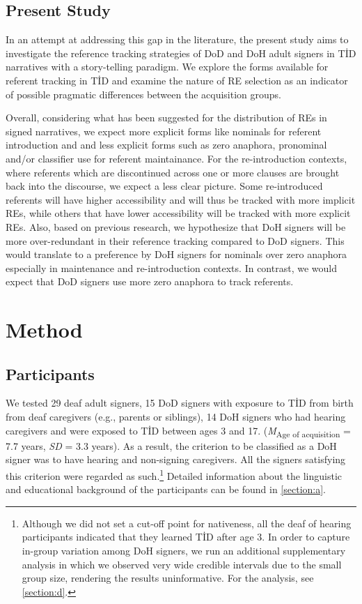 \documentclass[]{elsarticle} %
\begin{document}
\hypertarget{present-study}{%
\subsection{Present Study}\label{present-study}}

In an attempt at addressing this gap in the literature, the present
study aims to investigate the reference tracking strategies of DoD and
DoH adult signers in TİD narratives with a story-telling paradigm. We
explore the forms available for referent tracking in TİD and examine the
nature of RE selection as an indicator of possible pragmatic differences
between the acquisition groups.

Overall, considering what has been suggested for the distribution of REs
in signed narratives, we expect more explicit forms like nominals for
referent introduction and and less explicit forms such as zero anaphora,
pronominal and/or classifier use for referent maintainance. For the
re-introduction contexts, where referents which are discontinued across
one or more clauses are brought back into the discourse, we expect a
less clear picture. Some re-introduced referents will have higher
accessibility and will thus be tracked with more implicit REs, while
others that have lower accessibility will be tracked with more explicit
REs. Also, based on previous research, we hypothesize that DoH signers
will be more over-redundant in their reference tracking compared to DoD
signers. This would translate to a preference by DoH signers for
nominals over zero anaphora especially in maintenance and
re-introduction contexts. In contrast, we would expect that DoD signers
use more zero anaphora to track referents.

\hypertarget{method}{%
\section{Method}\label{method}}

\hypertarget{participants}{%
\subsection{Participants}\label{participants}}

We tested 29 deaf adult signers, 15 DoD signers with exposure to TİD
from birth from deaf caregivers (e.g., parents or siblings), 14 DoH
signers who had hearing caregivers and were exposed to TİD between ages
3 and 17. (\emph{M}\textsubscript{Age of acquisition} = 7.7 years,
\emph{SD} = 3.3 years). As a result, the criterion to be classified as a
DoH signer was to have hearing and non-signing caregivers. All the
signers satisfying this criterion were regarded as
such.\footnote{Although we did not set a cut-off point for nativeness, all the deaf of hearing participants indicated that they learned TİD after age 3. In order to capture in-group variation among DoH signers, we run an additional supplementary analysis in which we observed very wide credible intervals due to the small group size, rendering the results uninformative. For the analysis, see \ref{section:d}.}
Detailed information about the linguistic and educational background of
the participants can be found in \ref{section:a}.
\end{document}
